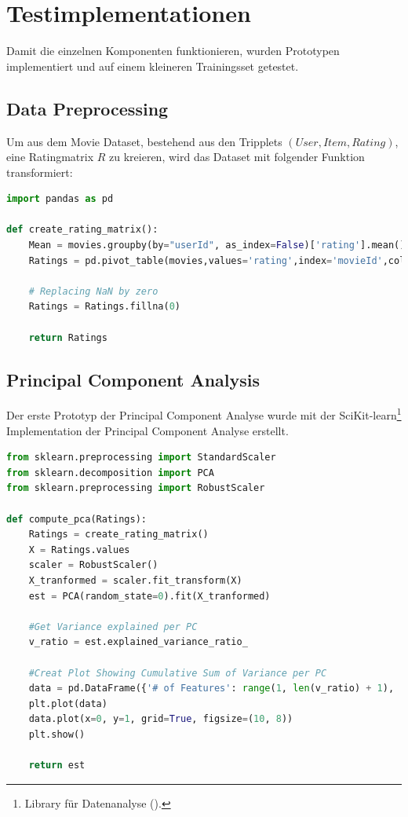 \newpage
\section{Testimplementationen}
Damit die einzelnen Komponenten funktionieren, wurden Prototypen implementiert und auf einem kleineren Trainingsset getestet.

\subsection{Data Preprocessing}
Um aus dem Movie Dataset, bestehend aus den Tripplets $(User, Item, Rating)$, eine Ratingmatrix $R$ zu kreieren, wird das Dataset mit folgender Funktion transformiert:

\begin{lstlisting}[language=Python, caption= Create Rating Matrix, label=lst:Create Rating Matrix]
import pandas as pd

def create_rating_matrix():
    Mean = movies.groupby(by="userId", as_index=False)['rating'].mean()
    Ratings = pd.pivot_table(movies,values='rating',index='movieId',columns='userId')
       
    # Replacing NaN by zero
    Ratings = Ratings.fillna(0)

    return Ratings        
\end{lstlisting}

\subsection{Principal Component Analysis}

Der erste Prototyp der Principal Component Analyse wurde mit der SciKit-learn\footnote{Library für Datenanalyse (\cite{scikit-learn}).} Implementation der Principal Component Analyse erstellt.

\begin{lstlisting}[language=Python, caption= Principal Component Analyse mit SciKit-learn,label=lst:PCA mit sci-kit]
from sklearn.preprocessing import StandardScaler
from sklearn.decomposition import PCA
from sklearn.preprocessing import RobustScaler

def compute_pca(Ratings):
    Ratings = create_rating_matrix()
    X = Ratings.values
    scaler = RobustScaler()
    X_tranformed = scaler.fit_transform(X)
    est = PCA(random_state=0).fit(X_tranformed)
    
    #Get Variance explained per PC
    v_ratio = est.explained_variance_ratio_
    
    #Creat Plot Showing Cumulative Sum of Variance per PC
    data = pd.DataFrame({'# of Features': range(1, len(v_ratio) + 1), '% Variance explained': np.cumsum(v_ratio * 100)})
    plt.plot(data)
    data.plot(x=0, y=1, grid=True, figsize=(10, 8))
    plt.show()
    
    return est

\end{lstlisting}

